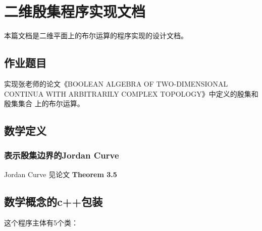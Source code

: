 \documentclass[a4paper]{book}
\makeatletter
\newcommand{\voidenvironment}[1]{%
  \expandafter\providecommand\csname env@#1@save@env\endcsname{}%
  \expandafter\providecommand\csname env@#1@process\endcsname{}%
  \@ifundefined{#1}{}{\RenewEnviron{#1}{}}%
}
\numberwithin{equation}{chapter}
\theoremstyle{definition}
\makeatother
\begin{document}
\pagestyle{empty}

\tableofcontents
\clearpage

\pagestyle{fancy}
\fancyhead{}
\rhead{\today}

\setcounter{chapter}{-1}




\chapter{二维殷集程序实现文档}
本篇文档是二维平面上的布尔运算的程序实现的设计文档。


\section{\heiti 作业题目}
实现张老师的论文《BOOLEAN ALGEBRA OF TWO-DIMENSIONAL CONTINUA
WITH ARBITRARILY COMPLEX TOPOLOGY》中定义的殷集和殷集集合
上的布尔运算。

\section{\heiti 数学定义}
\subsection{表示殷集边界的Jordan Curve}
	Jordan Curve 见论文 \textbf{Theorem 3.5} 




\section{\heiti 数学概念的c++包装}

这个程序主体有5个类：
\end{document}
